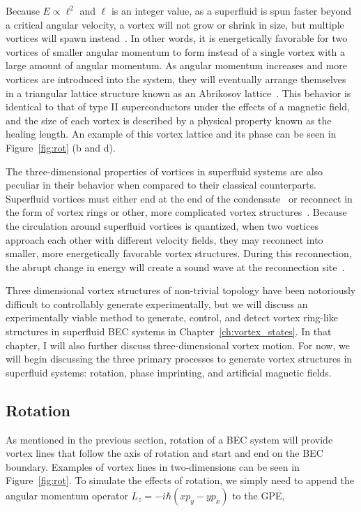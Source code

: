 Because $E \propto \ell^2$ and $\ell$ is an integer value, as a superfluid is spun faster beyond a critical angular velocity, a vortex will not grow or shrink in size, but multiple vortices will spawn instead~\cite{pethick2002}.
In other words, it is energetically favorable for two vortices of smaller angular momentum to form instead of a single vortex with a large amount of angular momentum.
As angular momentum increases and more vortices are introduced into the system, they will eventually arrange themselves in a triangular lattice structure known as an Abrikosov lattice~\cite{abrikosov1957, fetter2001}.
This behavior is identical to that of type II superconductors under the effects of a magnetic field, and the size of each vortex is described by a physical property known as the healing length.
An example of this vortex lattice and its phase can be seen in Figure~\ref{fig:rot} (b and d).

The three-dimensional properties of vortices in superfluid systems are also peculiar in their behavior when compared to their classical counterparts.
Superfluid vortices must either end at the end of the condensate~\cite{madison2000} or reconnect in the form of vortex rings or other, more complicated vortex structures~\cite{reichl2013, barenghi2014}.
Because the circulation around superfluid vortices is quantized, when two vortices approach each other with different velocity fields, they may reconnect into smaller, more energetically favorable vortex structures.
During this reconnection, the abrupt change in energy will create a sound wave at the reconnection site~\cite{feynman1955}.

Three dimensional vortex structures of non-trivial topology have been notoriously difficult to controllably generate experimentally, but we will discuss an experimentally viable method to generate, control, and detect vortex ring-like structures in superfluid BEC systems in Chapter~\ref{ch:vortex_states}.
In that chapter, I will also further discuss three-dimensional vortex motion.
 For now, we will begin discussing the three primary processes to generate vortex structures in superfluid systems: rotation, phase imprinting, and artificial magnetic fields.

\subsection{Rotation}

\label{sec:rot}
As mentioned in the previous section, rotation of a BEC system will provide vortex lines that follow the axis of rotation and start and end on the BEC boundary.
Examples of vortex lines in two-dimensions can be seen in Figure~\ref{fig:rot}.
To simulate the effects of rotation, we simply need to append the angular momentum operator $L_z = -i\hbar(xp_y - yp_x)$ to the GPE,

